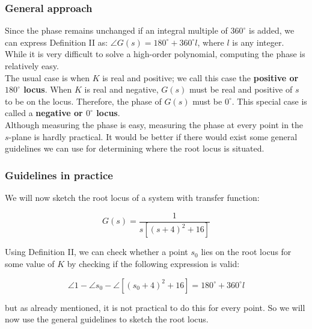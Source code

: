 \begin{frame}
\frametitle{General approach}
	Since the phase remains unchanged if an integral multiple of $360^{\circ}$ is added, we can express Definition II as: $\angle G(s) = 180^{\circ} + 360^{\circ}l$, where $l$ is any integer. While it is very difficult to solve a high-order polynomial, computing the phase is relatively easy.\\
	\vspace{1em}
	The usual case is when $K$ is real and positive; we call this case the \textbf{positive or $180^{\circ}$ locus}. When $K$ is real and negative, $G(s)$ must be real and positive of $s$ to be on the locus. Therefore, the phase of $G(s)$ must be $0^{\circ}$. This special case is called a \textbf{negative or $0^{\circ}$ locus}.\\
	\vspace{1em}
	Although measuring the phase is easy, measuring the phase at every point in the $s$-plane is hardly practical. It would be better if there would exist some general guidelines we can use for determining where the root locus is situated.
\end{frame}

\begin{frame}
\frametitle{Guidelines in practice}
	We will now sketch the root locus of a system with transfer function:\\
	\begin{exampleblock}{}
		\begin{equation}
		G(s) = \frac{1}{s[(s+4)^{2} + 16]}
		\end{equation}
	\end{exampleblock}
	Using Definition II, we can check whether a point $s_0$ lies on the root locus for some value of $K$ by checking if the following expression is valid: 
	\begin{exampleblock}{}
		\begin{equation}
		\angle 1 - \angle s_0 -\angle [(s_0 + 4)^2 + 16] = 180^{\circ} + 360^{\circ}l
		\end{equation}
	\end{exampleblock}
	but as already mentioned, it is not practical to do this for every point. So we will now use the general guidelines to sketch the root locus. 
\end{frame}	

